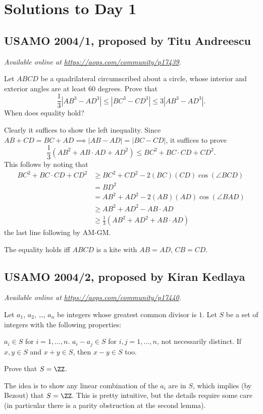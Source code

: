 \documentclass[11pt]{scrartcl}
\begin{document}
\section{Solutions to Day 1}
\subsection{USAMO 2004/1, proposed by Titu Andreescu}
\textsl{Available online at \url{https://aops.com/community/p17439}.}
\begin{mdframed}[style=mdpurplebox,frametitle={Problem statement}]
Let $ABCD$ be a quadrilateral circumscribed about a circle,
whose interior and exterior angles are at least $60$ degrees.
Prove that
\[ \frac{1}{3}|AB^3 - AD^3|
  \le |BC^3 - CD^3| \le 3|AB^3 - AD^3|.  \]
When does equality hold?
\end{mdframed}
Clearly it suffices to show the left inequality.
Since $AB+CD = BC+AD \implies |AB-AD| = |BC-CD|$, it suffices to prove
\[ \frac13(AB^2 + AB \cdot AD + AD^2)
\le BC^2 + BC \cdot CD + CD^2. \]
This follows by noting that
\begin{align*}
  BC^2 + BC \cdot CD + CD^2
  &\ge BC^2 + CD^2 - 2(BC)(CD)\cos(\angle BCD) \\
  &= BD^2 \\
  &= AB^2 + AD^2 - 2(AB)(AD)\cos(\angle BAD) \\
  &\ge AB^2 + AD^2 - AB \cdot AD \\
  &\ge \tfrac13(AB^2 + AD^2 + AB \cdot AD)
\end{align*}
the last line following by AM-GM.

The equality holds iff $ABCD$ is a kite with $AB=AD$, $CB=CD$.
\pagebreak

\subsection{USAMO 2004/2, proposed by Kiran Kedlaya}
\textsl{Available online at \url{https://aops.com/community/p17440}.}
\begin{mdframed}[style=mdpurplebox,frametitle={Problem statement}]
Let $a_1$, $a_2$, \dots, $a_n$ be integers whose greatest common
divisor is $1$.
Let $S$ be a set of integers with the following properties:
\begin{enumerate}
  \ii[(a)] $a_i \in S$ for $i = 1, \dots, n$.
  \ii[(b)] $a_i - a_j \in S$ for $i, j = 1, \dots, n$,
  not necessarily distinct.
  \ii[(c)] If $x, y \in S$ and $x+y \in S$,
  then $x-y \in S$ too.
\end{enumerate}
Prove that $S = \ZZ$.
\end{mdframed}
The idea is to show any linear combination of the $a_i$ are in $S$,
which implies (by Bezout) that $S = \ZZ$.
This is pretty intuitive, but the details require some care
(in particular there is a parity obstruction at the second lemma).
\end{document}
